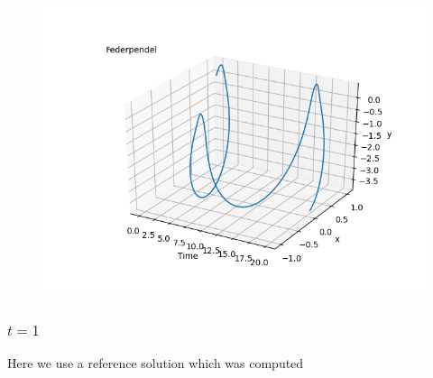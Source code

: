 \begin{figure}[H]
\centering
\includegraphics[scale=0.6]{../results/trajectories/federpendel_trajectory.png}
\end{figure}

\subsubsection{\(t = 1\)}

Here we use a reference solution which was computed 


